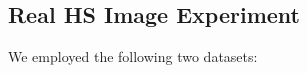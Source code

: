 %
%
%
%
%
%



\subsection{Real HS Image Experiment}
\label{subsec:RealHSIExpt}


We employed the following two datasets:
